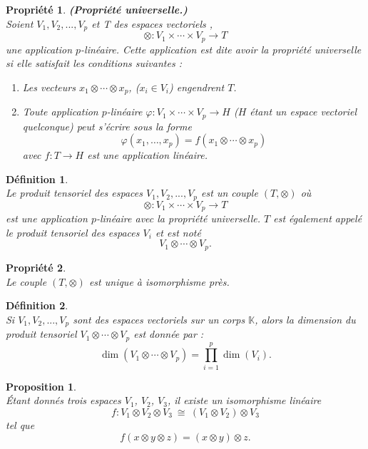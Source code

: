 \documentclass[a4paper, 14pt]{report}
\newtheorem{definition}{Définition}[section]
\newtheorem{proposition}{Proposition}[section]
\newtheorem{propriety}{Propriété}[section]
\begin{document}
\begin{onehalfspace}
{\begin{propriety}\textbf{(Propriété universelle.)} \cite{greub2012linear}\\
Soient \( V_1, V_2, ... ,V_p \) et T des espaces vectoriels , 
	\[
	\otimes : V_1 \times \cdots \times V_p \to T
	\]
	une application \( p \)-linéaire. Cette application est dite avoir la \textit{propriété universelle} si elle satisfait les conditions suivantes :
	\begin{enumerate} [label=\roman*)]
		\item Les vecteurs \( x_1 \otimes \cdots \otimes x_p \), (\( x_i \in V_i \)) engendrent \( T \).
		\item Toute application \( p \)-linéaire \( \varphi : V_1 \times \cdots \times V_p \to H \) (\( H \) étant un espace vectoriel quelconque) peut s'écrire sous la forme
		\[
		\varphi(x_1, \ldots, x_p) = f(x_1 \otimes \cdots \otimes x_p)
		\]
		avec \( f : T \to H \) est une application linéaire.
	\end{enumerate}
\end{propriety}

\begin{definition} \cite{greub2012linear}\\
Le produit tensoriel des espaces \( V_1, V_2, ... ,V_p \) est un couple \( (T, \otimes) \) où
	\[
	\otimes : V_1 \times \cdots \times V_p \to T
	\]
	est une application \( p \)-linéaire avec la propriété universelle. \( T \) est également appelé le produit tensoriel des espaces \( V_i \) et est noté
	\[
	V_1 \otimes \cdots \otimes V_p.
	\]
\end{definition}

\begin{propriety} \cite{greub2012linear}\\
Le couple \( (T, \otimes) \) est unique à isomorphisme près.
\end{propriety}


\begin{definition} \cite{greub2012linear}\\
Si \( V_1, V_2, ... ,V_p \) sont des espaces vectoriels sur un corps \( \mathbb{K} \), alors la dimension du produit tensoriel \( V_1 \otimes \cdots \otimes V_p \) est donnée par :
	\[
	\dim(V_1 \otimes \cdots \otimes V_p) = \prod_{i=1}^p \dim(V_i).
	\]
\end{definition}



\begin{proposition}\cite{greub2012linear}\\
Étant donnés trois espaces \(V_1\), \(V_2\), \(V_3\), il existe un isomorphisme linéaire  
	\[
	f : V_1 \otimes V_2 \otimes V_3 \ \cong \ (V_1 \otimes V_2) \otimes V_3
	\]
	tel que
	\[
	f(x \otimes y \otimes z) = (x \otimes y) \otimes z.
	\]
\end{proposition}


}
\end{onehalfspace}
\end{document}
